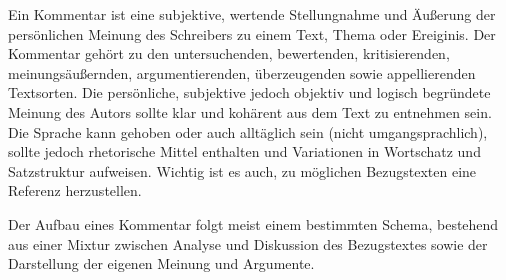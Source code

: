 



\thispagestyle{plain}



Ein Kommentar ist eine subjektive, wertende Stellungnahme und \"{A}u\ss{}erung der pers\"{o}nlichen Meinung des Schreibers zu einem Text, Thema oder Ereiginis. Der Kommentar geh\"{o}rt zu den untersuchenden, bewertenden, kritisierenden, meinungs\"{a}u\ss{}ernden, argumentierenden, \"{u}berzeugenden sowie appellierenden Textsorten. Die pers\"{o}nliche, subjektive jedoch objektiv und logisch begr\"{u}ndete Meinung des Autors sollte klar und koh\"{a}rent aus dem Text zu entnehmen sein. Die Sprache kann gehoben oder auch allt\"{a}glich sein (nicht umgangsprachlich), sollte jedoch rhetorische Mittel enthalten und Variationen in Wortschatz und Satzstruktur aufweisen. Wichtig ist es auch, zu m\"{o}glichen Bezugstexten eine Referenz herzustellen.


Der Aufbau eines Kommentar folgt meist einem bestimmten Schema, bestehend aus einer Mixtur zwischen Analyse und Diskussion des Bezugstextes sowie der Darstellung der eigenen Meinung und Argumente.

